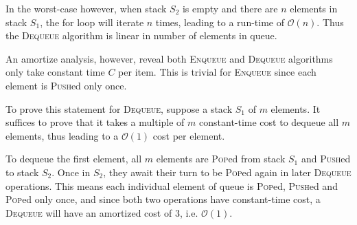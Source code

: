 In the worst-case however, when stack $S_2$ is empty and there are $n$ elements in stack $S_1$, the for loop will iterate $n$ times, leading to a run-time of $\mathcal{O}(n)$. Thus the \textsc{Dequeue} algorithm is linear in number of elements in queue.

An amortize analysis, however, reveal both \textsc{Enqueue} and \textsc{Dequeue} algorithms only take constant time $C$ per item. This is trivial for \textsc{Enqueue} since each element is \textsc{Push}ed only once.

To prove this statement for \textsc{Dequeue}, suppose a stack $S_1$ of $m$ elements. It suffices to prove that it takes a multiple of $m$ constant-time cost to dequeue all $m$ elements, thus leading to a $\mathcal{O}(1)$ cost per element.

To dequeue the first element, all $m$ elements are \textsc{Pop}ed from stack $S_1$ and \textsc{Push}ed to stack $S_2$. Once in $S_2$, they await their turn to be \textsc{Pop}ed again in later \textsc{Dequeue} operations. This means each individual element of queue is \textsc{Pop}ed, \textsc{Push}ed and \textsc{Pop}ed only once, and since both two operations have constant-time cost, a \textsc{Dequeue} will have an amortized cost of 3, i.e. $\mathcal{O}(1)$.
